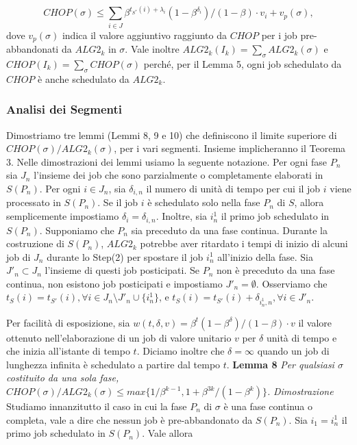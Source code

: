\documentclass[12pt]{article}
\begin{document}
$$CHOP(\sigma) \leq \sum_{i \in J} \beta^{t_{S^{*}}(i)+\lambda_{i}} (1 - \beta^{\delta_{i}})/(1 - \beta) \cdot v_{i} + v_{p}(\sigma),$$
dove $v_{p}(\sigma)$ indica il valore aggiuntivo raggiunto da $CHOP$ per i job pre-abbandonati da $ALG2_{k}$ in $\sigma$. Vale inoltre $ALG2_{k}(I_{k}) = \sum_{\sigma} ALG2_{k}(\sigma)$ e $CHOP(I_{k}) =\sum_{\sigma}CHOP(\sigma)$ perché, per il Lemma 5, ogni job schedulato da $CHOP$ è anche schedulato da $ALG2_{k}$.

\subsubsection{Analisi dei Segmenti}
Dimostriamo tre lemmi (Lemmi 8, 9 e 10) che definiscono il limite superiore di $CHOP(\sigma)/ALG2_{k}(\sigma)$, per i vari segmenti. Insieme implicheranno il Teorema 3. Nelle dimostrazioni dei lemmi usiamo la seguente notazione. Per ogni fase $P_{n}$ sia $J_{n}$ l'insieme dei job che sono parzialmente o completamente elaborati in $S(P_{n})$. Per ogni $i \in J_{n}$, sia $\delta_{i,n}$ il numero di unità di tempo per cui il job $i$ viene processato in $S(P_{n})$. Se il job $i$ è schedulato solo nella fase $P_{n}$ di $S$, allora semplicemente impostiamo $\delta_{i} = \delta_{i,n}$. Inoltre, sia $i^{1}_{n}$ il primo job schedulato in $S(P_{n})$. Supponiamo che $P_{n}$ sia preceduto da una fase continua. Durante la costruzione di $S(P_{n})$, $ALG2_{k}$ potrebbe aver ritardato i tempi di inizio di alcuni job di $J_{n}$ durante lo Step(2) per spostare il job $i^{1}_{n}$ all'inizio della fase. Sia $J'_{n} \subset J_{n}$ l'insieme di questi job posticipati. Se $P_{n}$ non è preceduto da una fase continua, non esistono job posticipati e impostiamo $J'_{n} = \emptyset$. Osserviamo che $t_{S}(i) = t_{S'}(i), \forall i \in J_{n} \setminus J'_{n} \cup \{i^{1}_{n}\}$, e $t_{S}(i) = t_{S'}(i) + \delta_{i^{1}_{n},n}, \forall i \in J'_{n}$.

Per facilità di esposizione, sia $w(t, \delta, v) = \beta^{t} (1 - \beta^{\delta}) / (1 - \beta) \cdot v$ il valore ottenuto nell'elaborazione di un job di valore unitario $v$ per $\delta$ unità di tempo e che inizia all'istante di tempo $t$. Diciamo inoltre che $\delta = \infty$ quando un job di lunghezza infinita è schedulato a partire dal tempo $t$.
\newline \newline
\textbf{Lemma 8}
\textit{Per qualsiasi $\sigma$ costituito da una sola fase, $CHOP(\sigma) / ALG2_{k}(\sigma) \leq max \{1 / \beta^{k - 1}, 1 + \beta^{3k} / (1 - \beta^{k})\}$.}
\newline \newline
\textit{Dimostrazione} 
Studiamo innanzitutto il caso in cui la fase $P_{n}$ di $\sigma$ è una fase continua o completa, vale a dire che nessun job è pre-abbandonato da $S(P_{n})$. Sia $i_{1} = i^{1}_{n}$ il primo job schedulato in $S(P_{n})$. Vale allora
\end{document}
